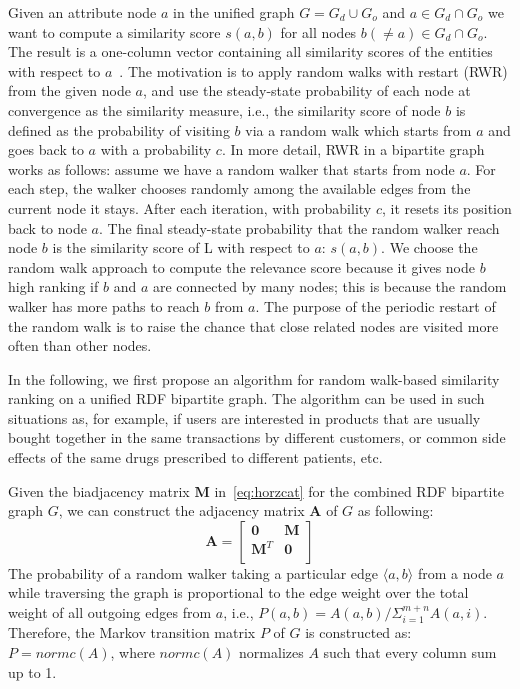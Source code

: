 Given an attribute node $a$ in the unified graph $G = G_d \cup G_o$ and $a \in G_d \cap G_o$ we want to compute a similarity score $s(a, b)$ for all nodes $b(\neq a) \in G_d \cap G_o$. The result is a one-column vector containing all similarity scores of the entities with respect to $a$~\cite{Chen_tuplerank:ranking}. The motivation is to apply random walks with restart (RWR) from the given node $a$, and use the steady-state probability of each node at convergence as the similarity measure, i.e., the similarity score of node $b$ is defined as the probability of visiting $b$ via a random walk which starts from $a$ and goes back to $a$ with a probability $c$. In more detail, RWR in a bipartite graph works as follows: assume we have a random walker that starts from node $a$. For each step, the walker chooses randomly among the available edges from the current node it stays. After each iteration, with probability $c$, it resets its position back to node $a$. The final steady-state probability that the random walker reach node $b$ is the similarity score of L with respect to $a$: $s(a, b)$. We choose the random walk approach to compute the relevance score because it gives node $b$ high ranking if $b$ and $a$ are connected by many nodes; this is because the random walker has more paths to reach $b$ from $a$. The purpose of the periodic restart of the random walk is to raise the chance that close related nodes are visited more often than other nodes.

In the following, we first propose an algorithm for random walk-based similarity ranking on a unified RDF bipartite graph. The algorithm can be used in such situations as, for example, if users are interested in products that are usually bought together in the same transactions by different customers, or common side effects of the same drugs prescribed to different patients, etc.

Given the biadjacency matrix $\mathbf{M}$ in~\ref{eq:horzcat} for the combined RDF bipartite graph $G$, we can construct the adjacency matrix $\mathbf{A}$ of $G$ as following:
\[
\mathbf{A}=\left[
               \begin{array}{cc}
                 \mathbf{0}   & \mathbf{M} \\
                 \mathbf{M}^T & \mathbf{0} \\
               \end{array}
             \right]
\]
The probability of a random walker taking a particular edge $\langle a,b\rangle$ from a node $a$ while traversing the graph is proportional to the edge weight over the total weight of all outgoing edges from $a$, i.e., $P(a,b)=A(a,b)/\Sigma_{i=1}^{m+n}A(a,i)$. Therefore, the Markov transition matrix $P$ of $G$ is constructed as: $P=normc(A)$, where $normc(A)$ normalizes $A$ such that every column sum up to 1.

